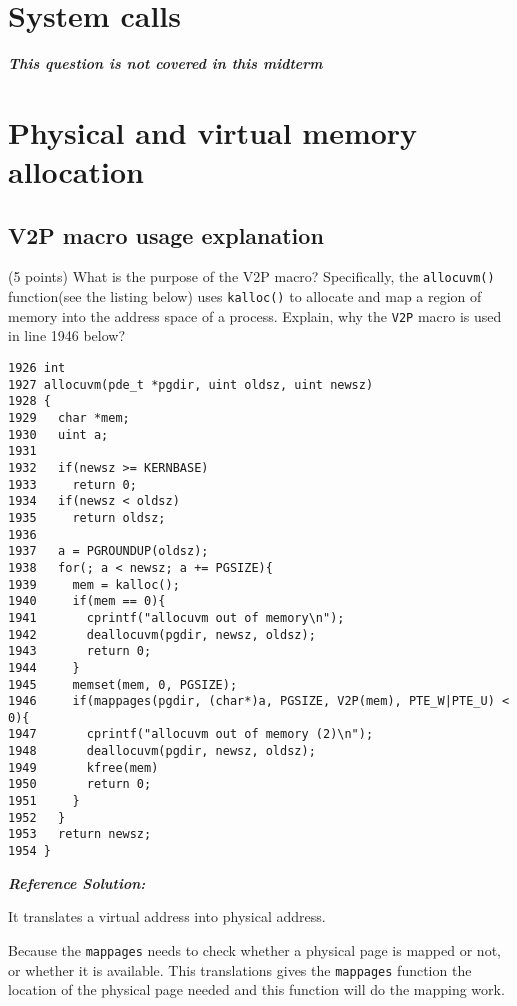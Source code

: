 \documentclass[]{article}
\begin{document}
\hypertarget{system-calls}{%
\section{System calls}\label{system-calls}}

\textbf{\emph{This question is not covered in this midterm}}

\hypertarget{physical-and-virtual-memory-allocation}{%
\section{Physical and virtual memory
allocation}\label{physical-and-virtual-memory-allocation}}

\hypertarget{v2p-macro-usage-explanation}{%
\subsection{V2P macro usage
explanation}\label{v2p-macro-usage-explanation}}

(5 points) What is the purpose of the V2P macro? Specifically, the
\texttt{allocuvm()} function(see the listing below) uses
\texttt{kalloc()} to allocate and map a region of memory into the
address space of a process. Explain, why the \texttt{V2P} macro is used
in line 1946 below?

\begin{verbatim}
1926 int
1927 allocuvm(pde_t *pgdir, uint oldsz, uint newsz)
1928 {
1929   char *mem;
1930   uint a;
1931
1932   if(newsz >= KERNBASE)
1933     return 0;
1934   if(newsz < oldsz)
1935     return oldsz;
1936
1937   a = PGROUNDUP(oldsz);
1938   for(; a < newsz; a += PGSIZE){
1939     mem = kalloc();
1940     if(mem == 0){
1941       cprintf("allocuvm out of memory\n");
1942       deallocuvm(pgdir, newsz, oldsz);
1943       return 0;
1944     }
1945     memset(mem, 0, PGSIZE);
1946     if(mappages(pgdir, (char*)a, PGSIZE, V2P(mem), PTE_W|PTE_U) < 0){
1947       cprintf("allocuvm out of memory (2)\n");
1948       deallocuvm(pgdir, newsz, oldsz);
1949       kfree(mem)
1950       return 0;
1951     }
1952   }
1953   return newsz;
1954 }
\end{verbatim}

\textbf{\emph{Reference Solution:}}

It translates a virtual address into physical address.

Because the \texttt{mappages} needs to check whether a physical page is
mapped or not, or whether it is available. This translations gives the
\texttt{mappages} function the location of the physical page needed and
this function will do the mapping work.
\end{document}
